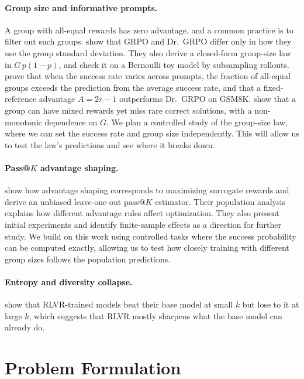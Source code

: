 \documentclass{article}
\theoremstyle{definition}
\newcommand{\1}{\mathbf{1}}
\begin{document}
\paragraph{Group size and informative prompts.}
A group with all-equal rewards has zero advantage, and a common practice is
to filter out such groups. \citet{bay2026grpostd} show that GRPO and Dr.~GRPO
differ only in how they use the group standard deviation. They also derive a
closed-form group-size law in $G\,p(1-p)$, and check it on a Bernoulli toy
model by subsampling rollouts. \citet{nie2026starvation} prove that when the success rate varies across
prompts, the fraction of all-equal groups exceeds the prediction from the
average success rate, and that a fixed-reference advantage $A = 2r - 1$
outperforms Dr.~GRPO on GSM8K. \citet{plyusov2026fgrpo} show that
a group can have mixed rewards yet miss rare correct solutions, with a
non-monotonic dependence on $G$. We plan a controlled study of the group-size
law, where we can set the success rate and group size independently.
This will allow us to test the law's predictions and see where it breaks down.

\paragraph{Pass@$K$ advantage shaping.}
\citet{thrampoulidis2026passk} show how advantage shaping corresponds to
maximizing surrogate rewards and derive an unbiased leave-one-out pass@$K$
estimator. Their population analysis explains how different advantage rules
affect optimization. They also present initial experiments and identify
finite-sample effects as a direction for further study. We build on this
work using controlled tasks where the success probability can be computed
exactly, allowing us to test how closely training with different group sizes
follows the population predictions.

\paragraph{Entropy and diversity collapse.}
\citet{yue2025doesrl} show that RLVR-trained models beat their base model
at small $k$ but lose to it at large $k$, which suggests that RLVR mostly
sharpens what the base model can already do.

\section{Problem Formulation}
\label{sec:problem}
\end{document}
